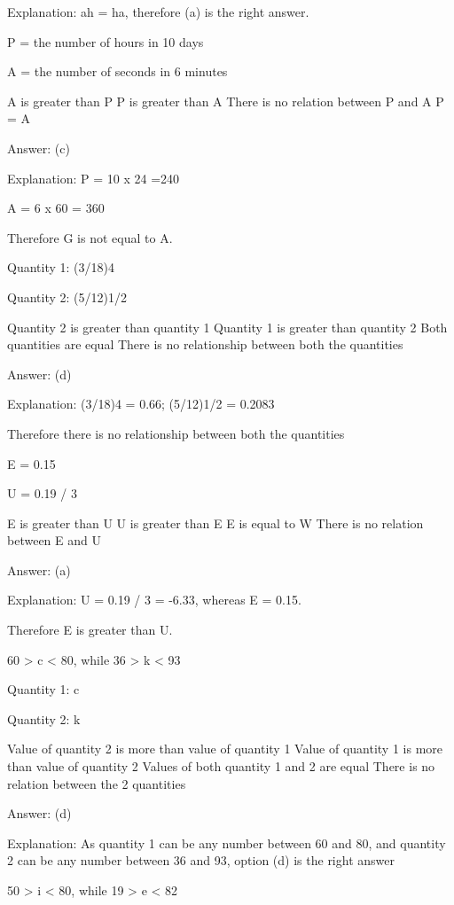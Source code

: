     Explanation: ah = ha, therefore (a) is the right answer.

    P = the number of hours in 10 days

    A = the number of seconds in 6 minutes

        A is greater than P
        P is greater than A
        There is no relation between P and A
        P = A

    Answer: (c)

    Explanation: P = 10 x 24 =240

    A = 6 x 60 = 360

    Therefore G is not equal to A.

        Quantity 1: (3/18)4

    Quantity 2: (5/12)1/2

        Quantity 2 is greater than quantity 1
        Quantity 1 is greater than quantity 2
        Both quantities are equal
        There is no relationship between both the quantities

    Answer:  (d)

    Explanation: (3/18)4 = 0.66; (5/12)1/2 = 0.2083

    Therefore there is no relationship between both the quantities

    E = 0.15

    U = 0.19 / 3

        E is greater than U
        U is greater than E
        E is equal to W
        There is no relation between E and U

    Answer: (a)

    Explanation: U = 0.19 / 3 = -6.33, whereas E = 0.15.

    Therefore E is greater than U.

    60 > c < 80, while 36 > k < 93

    Quantity 1: c

    Quantity 2: k

        Value of quantity 2 is more than value of quantity 1
        Value of quantity 1 is more than value of quantity 2
        Values of both quantity 1 and 2 are equal
        There is no relation between the 2 quantities

    Answer: (d)

    Explanation: As quantity 1 can be any number between 60 and 80, and quantity 2 can be any number between 36 and 93, option (d) is the right answer

    50 > i < 80, while 19 > e < 82

